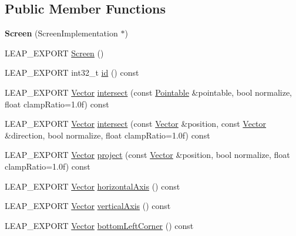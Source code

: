 \subsection*{Public Member Functions}
\begin{DoxyCompactItemize}
\item 
\hypertarget{class_leap_1_1_screen_ae4bacceec22fd48fa983f863854a1442}{{\bfseries Screen} (Screen\+Implementation $\ast$)}\label{class_leap_1_1_screen_ae4bacceec22fd48fa983f863854a1442}

\item 
L\+E\+A\+P\+\_\+\+E\+X\+P\+O\+R\+T \hyperlink{class_leap_1_1_screen_a65dcdd83ed5edb4f6e19a9a40edcb96f}{Screen} ()
\item 
L\+E\+A\+P\+\_\+\+E\+X\+P\+O\+R\+T int32\+\_\+t \hyperlink{class_leap_1_1_screen_ae209881171841c1c172b582640e5c31c}{id} () const 
\item 
L\+E\+A\+P\+\_\+\+E\+X\+P\+O\+R\+T \hyperlink{struct_leap_1_1_vector}{Vector} \hyperlink{class_leap_1_1_screen_a4264a354488a387ab5657c73d594b41a}{intersect} (const \hyperlink{class_leap_1_1_pointable}{Pointable} \&pointable, bool normalize, float clamp\+Ratio=1.\+0f) const 
\item 
L\+E\+A\+P\+\_\+\+E\+X\+P\+O\+R\+T \hyperlink{struct_leap_1_1_vector}{Vector} \hyperlink{class_leap_1_1_screen_af7f4942267686be891f371feff54edd2}{intersect} (const \hyperlink{struct_leap_1_1_vector}{Vector} \&position, const \hyperlink{struct_leap_1_1_vector}{Vector} \&direction, bool normalize, float clamp\+Ratio=1.\+0f) const 
\item 
L\+E\+A\+P\+\_\+\+E\+X\+P\+O\+R\+T \hyperlink{struct_leap_1_1_vector}{Vector} \hyperlink{class_leap_1_1_screen_a5ac637faf6b1c296ce3289265ecb359d}{project} (const \hyperlink{struct_leap_1_1_vector}{Vector} \&position, bool normalize, float clamp\+Ratio=1.\+0f) const 
\item 
L\+E\+A\+P\+\_\+\+E\+X\+P\+O\+R\+T \hyperlink{struct_leap_1_1_vector}{Vector} \hyperlink{class_leap_1_1_screen_aa6007a37823a83b7620256037337e7f3}{horizontal\+Axis} () const 
\item 
L\+E\+A\+P\+\_\+\+E\+X\+P\+O\+R\+T \hyperlink{struct_leap_1_1_vector}{Vector} \hyperlink{class_leap_1_1_screen_a195e300396f259a01a9115ce18bf66da}{vertical\+Axis} () const 
\item 
L\+E\+A\+P\+\_\+\+E\+X\+P\+O\+R\+T \hyperlink{struct_leap_1_1_vector}{Vector} \hyperlink{class_leap_1_1_screen_a617b14ae37341969a59a5f99cae61ac4}{bottom\+Left\+Corner} () const 
\item 

\end{DoxyCompactItemize}
